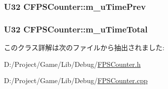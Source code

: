 \subsubsection[{m\+\_\+u\+Time\+Prev}]{\setlength{\rightskip}{0pt plus 5cm}U32 C\+F\+P\+S\+Counter\+::m\+\_\+u\+Time\+Prev\hspace{0.3cm}{\ttfamily [private]}}\label{class_c_f_p_s_counter_a1c5d70cbc932c76ba74d5706ffb015f9}
\hypertarget{class_c_f_p_s_counter_a0f8e3c1f1555dc826e73d39fd8d6539a}{}
\subsubsection[{m\+\_\+u\+Time\+Total}]{\setlength{\rightskip}{0pt plus 5cm}U32 C\+F\+P\+S\+Counter\+::m\+\_\+u\+Time\+Total\hspace{0.3cm}{\ttfamily [private]}}\label{class_c_f_p_s_counter_a0f8e3c1f1555dc826e73d39fd8d6539a}


このクラス詳解は次のファイルから抽出されました\+:\begin{DoxyCompactItemize}
\item 
D\+:/\+Project/\+Game/\+Lib/\+Debug/\hyperlink{_f_p_s_counter_8h}{F\+P\+S\+Counter.\+h}\item 
D\+:/\+Project/\+Game/\+Lib/\+Debug/\hyperlink{_f_p_s_counter_8cpp}{F\+P\+S\+Counter.\+cpp}\end{DoxyCompactItemize}

